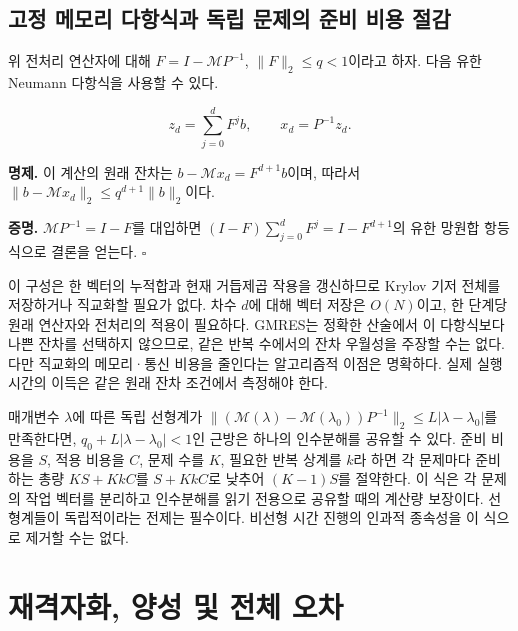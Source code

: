 \documentclass[
  10pt,
  a4paper,
]{article}
\begin{document}
\hypertarget{uxace0uxc815-uxba54uxbaa8uxb9ac-uxb2e4uxd56duxc2dduxacfc-uxb3c5uxb9bd-uxbb38uxc81cuxc758-uxc900uxbe44-uxbe44uxc6a9-uxc808uxac10}{%
\subsection{고정 메모리 다항식과 독립 문제의 준비 비용
절감}\label{uxace0uxc815-uxba54uxbaa8uxb9ac-uxb2e4uxd56duxc2dduxacfc-uxb3c5uxb9bd-uxbb38uxc81cuxc758-uxc900uxbe44-uxbe44uxc6a9-uxc808uxac10}}

위 전처리 연산자에 대해 \(F=I-\mathcal MP^{-1}\),
\(\|F\|_2\le q<1\)이라고 하자. 다음 유한 Neumann 다항식을 사용할 수
있다.

\[
z_d=\sum_{j=0}^dF^jb,\qquad x_d=P^{-1}z_d.
\]

\textbf{명제.} 이 계산의 원래 잔차는 \(b-\mathcal Mx_d=F^{d+1}b\)이며,
따라서 \(\|b-\mathcal Mx_d\|_2\le q^{d+1}\|b\|_2\)이다.

\textbf{증명.} \(\mathcal MP^{-1}=I-F\)를 대입하면
\((I-F)\sum_{j=0}^dF^j=I-F^{d+1}\)의 유한 망원합 항등식으로 결론을
얻는다. \(\square\)

이 구성은 한 벡터의 누적합과 현재 거듭제곱 작용을 갱신하므로 Krylov 기저
전체를 저장하거나 직교화할 필요가 없다. 차수 \(d\)에 대해 벡터 저장은
\(O(N)\)이고, 한 단계당 원래 연산자와 전처리의 적용이 필요하다. GMRES는
정확한 산술에서 이 다항식보다 나쁜 잔차를 선택하지 않으므로, 같은 반복
수에서의 잔차 우월성을 주장할 수는 없다. 다만 직교화의 메모리·통신
비용을 줄인다는 알고리즘적 이점은 명확하다. 실제 실행 시간의 이득은 같은
원래 잔차 조건에서 측정해야 한다.

매개변수 \(\lambda\)에 따른 독립 선형계가
\(\|(\mathcal M(\lambda)-\mathcal M(\lambda_0))P^{-1}\|_2\le L|\lambda-\lambda_0|\)를
만족한다면, \(q_0+L|\lambda-\lambda_0|<1\)인 근방은 하나의 인수분해를
공유할 수 있다. 준비 비용을 \(S\), 적용 비용을 \(C\), 문제 수를 \(K\),
필요한 반복 상계를 \(k\)라 하면 각 문제마다 준비하는 총량 \(KS+KkC\)를
\(S+KkC\)로 낮추어 \((K-1)S\)를 절약한다. 이 식은 각 문제의 작업 벡터를
분리하고 인수분해를 읽기 전용으로 공유할 때의 계산량 보장이다.
선형계들이 독립적이라는 전제는 필수이다. 비선형 시간 진행의 인과적
종속성을 이 식으로 제거할 수는 없다.

\hypertarget{uxc7acuxaca9uxc790uxd654-uxc591uxc131-uxbc0f-uxc804uxccb4-uxc624uxcc28}{%
\section{재격자화, 양성 및 전체
오차}\label{uxc7acuxaca9uxc790uxd654-uxc591uxc131-uxbc0f-uxc804uxccb4-uxc624uxcc28}}
\end{document}
